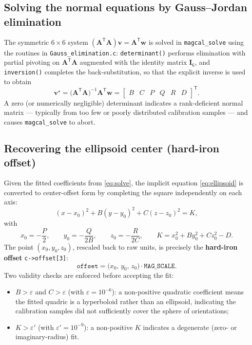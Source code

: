\documentclass[11pt]{article}
\newcommand{\vect}[1]{\bm{#1}}
\newcommand{\mat}[1]{\bm{#1}}
\newcommand{\transpose}{^{\mathsf{T}}}
\begin{document}
\subsection{Solving the normal equations by Gauss--Jordan elimination}

The symmetric $6\times6$ system $(\mat A\transpose\mat A)\vect v = \mat A\transpose\vect w$ is solved in \texttt{magcal\_solve} using the routines in \texttt{Gauss\_elimination.c}: \texttt{determinant()} performs elimination with partial pivoting on $\mat A\transpose\mat A$ augmented with the identity matrix $\mat I_6$, and \texttt{inversion()} completes the back-substitution, so that the explicit inverse is used to obtain
\begin{equation}
\vect v^{\star} = \big(\mat A\transpose \mat A\big)^{-1} \mat A\transpose \vect w = \begin{bmatrix}B & C & P & Q & R & D\end{bmatrix}\transpose.
\label{eq:solve}
\end{equation}
A zero (or numerically negligible) determinant indicates a rank-deficient normal matrix --- typically from too few or poorly distributed calibration samples --- and causes \texttt{magcal\_solve} to abort.

\subsection{Recovering the ellipsoid center (hard-iron offset)}

Given the fitted coefficients from \eqref{eq:solve}, the implicit equation \eqref{eq:ellipsoid} is converted to center-offset form by completing the square independently on each axis:
\begin{equation}
(x-x_0)^2 + B(y-y_0)^2 + C(z-z_0)^2 = K,
\label{eq:centered}
\end{equation}
with
\begin{equation}
x_0 = -\frac{P}{2}, \qquad y_0 = -\frac{Q}{2B}, \qquad z_0 = -\frac{R}{2C}, \qquad
K = x_0^2 + B y_0^2 + C z_0^2 - D .
\label{eq:center}
\end{equation}
The point $(x_0,y_0,z_0)$, rescaled back to raw units, is precisely the \textbf{hard-iron offset} \texttt{c->offset[3]}:
\begin{equation}
\texttt{offset} = \big(x_0,\,y_0,\,z_0\big)\cdot\texttt{MAG\_SCALE}.
\end{equation}
Two validity checks are enforced before accepting the fit:
\begin{itemize}
    \item $B>\varepsilon$ and $C>\varepsilon$ (with $\varepsilon=10^{-6}$): a non-positive quadratic coefficient means the fitted quadric is a hyperboloid rather than an ellipsoid, indicating the calibration samples did not sufficiently cover the sphere of orientations;
    \item $K>\varepsilon'$ (with $\varepsilon'=10^{-9}$): a non-positive $K$ indicates a degenerate (zero- or imaginary-radius) fit.
\end{itemize}
\end{document}
